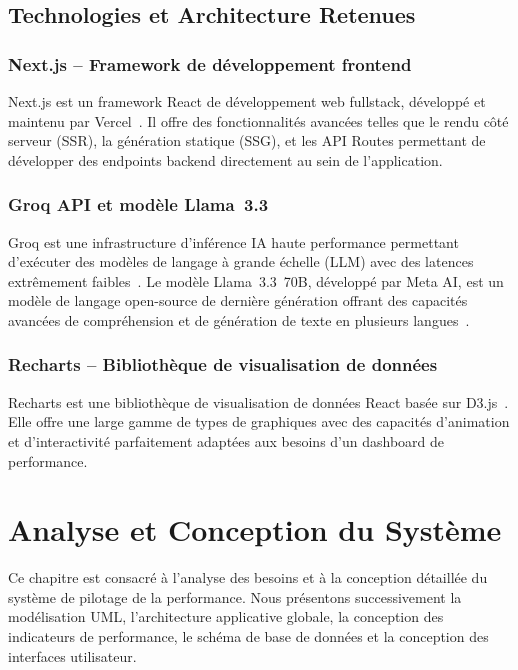 \documentclass[11pt,a4paper]{report}
\begin{document}
\section{Technologies et Architecture Retenues}

\subsection{Next.js -- Framework de développement frontend}

Next.js est un framework React de développement web fullstack, développé et maintenu par Vercel~\cite{nextjs2025}. Il offre des fonctionnalités avancées telles que le rendu côté serveur (SSR), la génération statique (SSG), et les API Routes permettant de développer des endpoints backend directement au sein de l'application.

\subsection{Groq API et modèle Llama~3.3}

Groq est une infrastructure d'inférence IA haute performance permettant d'exécuter des modèles de langage à grande échelle (LLM) avec des latences extrêmement faibles~\cite{groq2025}. Le modèle Llama~3.3~70B, développé par Meta AI, est un modèle de langage open-source de dernière génération offrant des capacités avancées de compréhension et de génération de texte en plusieurs langues~\cite{meta2024}.

\subsection{Recharts -- Bibliothèque de visualisation de données}

Recharts est une bibliothèque de visualisation de données React basée sur D3.js~\cite{recharts2025}. Elle offre une large gamme de types de graphiques avec des capacités d'animation et d'interactivité parfaitement adaptées aux besoins d'un dashboard de performance.

\chapter{Analyse et Conception du Système}

Ce chapitre est consacré à l'analyse des besoins et à la conception détaillée du système de pilotage de la performance. Nous présentons successivement la modélisation UML, l'architecture applicative globale, la conception des indicateurs de performance, le schéma de base de données et la conception des interfaces utilisateur.
\end{document}
